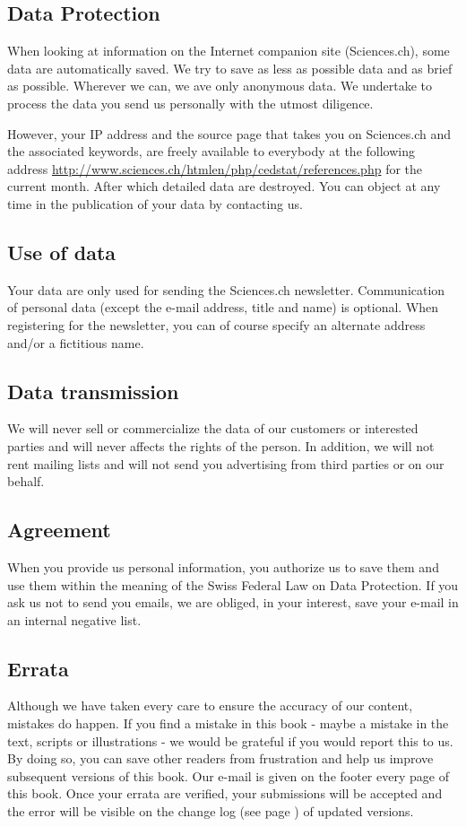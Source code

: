 	\pagebreak
	\subsection{Data Protection}
	When looking at information on the Internet companion site (Sciences.ch), some data are automatically saved. We try to save as less as possible data and as brief as possible. Wherever we can, we ave only anonymous data. We undertake to process the data you send us personally with the utmost diligence.

	However, your IP address and the source page that takes you on Sciences.ch and the associated keywords, are freely available to everybody at the following address \url{http://www.sciences.ch/htmlen/php/cedstat/references.php} for the current month. After which detailed data are destroyed. You can object at any time in the publication of your data by contacting us.

	\subsection{Use of data}

	Your data are only used for sending the Sciences.ch newsletter. Communication of personal data (except the e-mail address, title and name) is optional. When registering for the newsletter, you can of course specify an alternate address and/or a fictitious name.

	\subsection{Data transmission}

	We will never sell or commercialize the data of our customers or interested parties and will never affects the rights of the person. In addition, we will not rent mailing lists and will not send you advertising from third parties or on our behalf.

	\subsection{Agreement}

	When you provide us personal information, you authorize us to save them and use them within the meaning of the Swiss Federal Law on Data Protection. If you ask us not to send you emails, we are obliged, in your interest, save your e-mail in an internal negative list.
	
	\subsection{Errata}
	Although we have taken every care to ensure the accuracy of our content, mistakes do happen. If you find a mistake in this book - maybe a mistake in the text, scripts or illustrations - we would be grateful if you would report this to us. By doing so, you can save other readers from frustration and help us improve subsequent versions of this book. Our e-mail is given on the footer every page of this book. Once your errata are verified, your submissions will be accepted and the error will be visible on the change log (see page \pageref{change log}) of updated versions.

